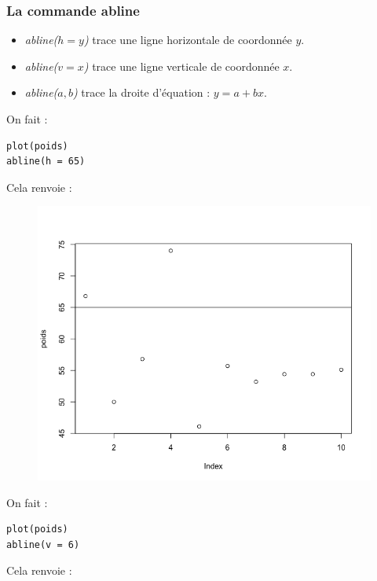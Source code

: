 \subsubsection{La commande abline}
\begin{itemize}
\item \textit{abline($h = y$)} trace une ligne horizontale de coordonnée $y$.
\item \textit{abline($v = x$)} trace une ligne verticale de coordonnée $x$.
\item \textit{abline($a, b$)} trace la droite d'équation : $y = a + bx$.
\end{itemize}
On fait :
\begin{lstlisting}[language=html]
plot(poids)
abline(h = 65)
\end{lstlisting}
Cela renvoie :
\begin{figure}[H]\begin{center}\includegraphics[scale=0.4]{ilu/gra58.png}\end{center}\end{figure}
On fait :
\begin{lstlisting}[language=html]
plot(poids)
abline(v = 6)
\end{lstlisting}
Cela renvoie :

